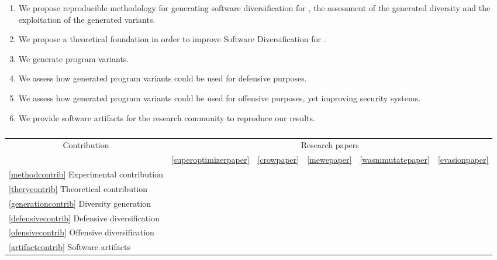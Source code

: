 \begin{enumerate}[label=\textbf{C\arabic*}, ref=C\arabic*]
	\item \label{methodcontrib}  We propose reproducible methodology for generating software diversification for \Wasm, the assessment of the generated diversity and the exploitation of the generated variants.
	
	\item \label{therycontrib}  We propose a theoretical foundation in order to improve Software Diversification for \Wasm.
	
	\item \label{generationcontrib}  We generate \Wasm program variants.
	
	\item \label{defensivecontrib}  We assess how generated \Wasm program variants could be used for defensive purposes.
	
	\item \label{ofensivecontrib}  We assess how generated \Wasm program variants could be used for offensive purposes, yet improving security systems.
	
	\item \label{artifactcontrib}  We provide software artifacts for the research community to reproduce our results.
\end{enumerate}

\begin{table}
	\centering
	\begin{tabular}{l | l l l l l }
		\multicolumn{1}{c|}{Contribution} & \multicolumn{5}{c}{Research papers} 
		\\
		& \ref{superoptimizerpaper}  & \ref{crowpaper} & \ref{mewepaper} & \ref{wasmmutatepaper} & \ref{evasionpaper} \\
		\hline
		\ref{methodcontrib} Experimental contribution & \checkmark & \checkmark & \checkmark & \checkmark & \checkmark \\
		\ref{therycontrib} Theoretical contribution & \checkmark & \checkmark &  &  \checkmark &  \\
		\ref{generationcontrib} Diversity generation &  & \checkmark & \checkmark & \checkmark & \checkmark\\
		\ref{defensivecontrib} Defensive diversification &  & \checkmark & \checkmark & \checkmark\\
		\ref{ofensivecontrib} Offensive diversification & & & & & \checkmark\\
		\ref{artifactcontrib} Software artifacts & \checkmark & \checkmark & \checkmark & \checkmark & \checkmark
	\end{tabular}
	\label{contribmap}
	\caption{}
\end{table}

